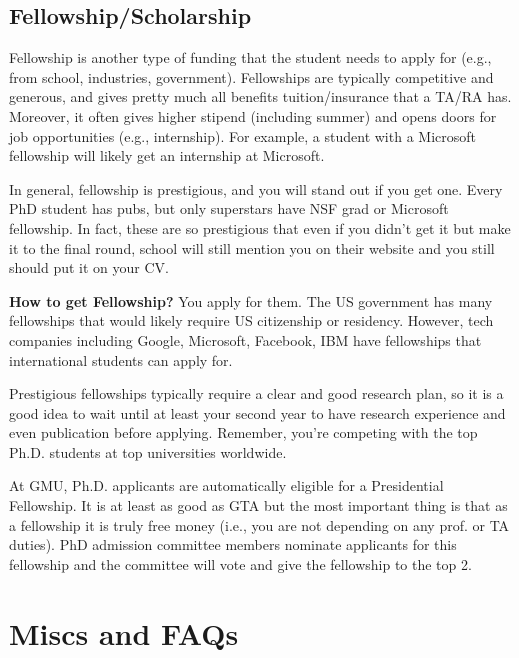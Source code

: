 \documentclass[11pt]{article}
\newenvironment{commentbox}{
 \small
    \begin{cbox}
 }{
   \end{cbox}
}
\begin{document}
\subsection{Fellowship/Scholarship}

Fellowship is another type of funding that the student needs to apply for (e.g., from school, industries, government). Fellowships are typically competitive and generous, and gives pretty much all benefits tuition/insurance that a TA/RA has.  Moreover, it often gives higher stipend (including summer) and opens doors for job opportunities (e.g., internship).  For example, a student with a Microsoft fellowship will likely get an internship at Microsoft.  

In general, fellowship is prestigious, and you will stand out if you get one.  Every PhD student has pubs, but only superstars have NSF grad or Microsoft fellowship. In fact, these are so prestigious that even if you didn't get it but make it to the final round, school will still mention you on their website and you still should put it on your CV.


\textbf{How to get Fellowship?} You apply for them.  The US government has many fellowships that would likely require US citizenship or residency.  However, tech companies including Google, Microsoft, Facebook, IBM have fellowships that international students can apply for. 

Prestigious fellowships typically require a clear and good research plan, so it is a good idea to wait until at least your second year to have research experience and even publication before applying. Remember, you're competing with the top Ph.D. students at top universities worldwide. 


\begin{commentbox}
At GMU, Ph.D. applicants are automatically eligible for a Presidential Fellowship.  It is at least as good as GTA but the most important thing is that as a fellowship it is truly free money (i.e., you are not depending on any prof. or TA duties).  PhD admission committee members nominate applicants for this fellowship and the committee will vote and give the fellowship to the top 2.
\end{commentbox}


\section{Miscs and FAQs}
\end{document}
